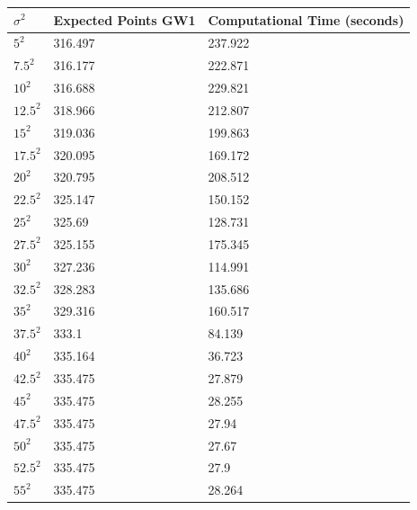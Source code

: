 \begin{table}[H]
\centering
\begin{tabular}{@{}lll@{}}
\toprule
$\sigma^2$ & Expected Points GW1 & Computational Time (seconds) \\ \midrule
$5^2$      & 316.497             & 237.922                      \\
$7.5^2$    & 316.177             & 222.871                      \\
$10^2$     & 316.688             & 229.821                      \\
$12.5^2$   & 318.966             & 212.807                      \\
$15^2$     & 319.036             & 199.863                      \\
$17.5^2$   & 320.095             & 169.172                      \\
$20^2$     & 320.795             & 208.512                      \\
$22.5^2$   & 325.147             & 150.152                      \\
$25^2$     & 325.69              & 128.731                      \\
$27.5^2$   & 325.155             & 175.345                      \\
$30^2$     & 327.236             & 114.991                      \\
$32.5^2$   & 328.283             & 135.686                      \\
$35^2$     & 329.316             & 160.517                      \\
$37.5^2$   & 333.1               & 84.139                       \\
$40^2$     & 335.164             & 36.723                       \\
$42.5^2$   & 335.475             & 27.879                       \\
$45^2$     & 335.475             & 28.255                       \\
$47.5^2$   & 335.475             & 27.94                        \\
$50^2$     & 335.475             & 27.67                        \\
$52.5^2$   & 335.475             & 27.9                         \\
$55^2$     & 335.475             & 28.264                       \\

\end{tabular}
\end{table}
